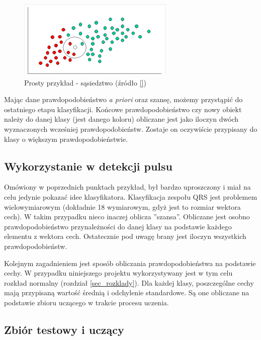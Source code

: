 \begin{figure}[!htb]
  \begin{center}
    \includegraphics[scale = 1]
    {img/bayes_przyklad_2.png}
  \end{center}
  \caption{Prosty przykład - sąsiedztwo (źródło \ref{})}
  \label{fig_bayes_przyklad2}
\end{figure}

Mając dane prawdopodobieństwo \textit{a priori} oraz szansę, możemy przystąpić do ostatniego etapu klasyfikacji. Końcowe prawdopodobieństwo czy nowy obiekt należy do danej klasy (jest danego koloru) obliczane jest jako iloczyn dwóch wyznaczonych wcześniej prawdopodobieństw. Zostaje on oczywiście przypisany do klasy o większym prawdopodobieństwie.


\subsection{Wykorzystanie w detekcji pulsu}
\label{subsec_bayes_detekcja_pulsu}

Omówiony w poprzednich punktach przykład, był bardzo uproszczony i miał na celu jedynie pokazać idee klasyfikatora. Klasyfikacja zespołu QRS jest problemem wielowymiarowym (dokładnie 18 wymiarowym, gdyż jest to rozmiar wektora cech). W takim przypadku nieco inaczej oblicza ''szansa''. Obliczane jest osobno prawdopodobieństwo przynależności do danej klasy na podstawie każdego elementu z wektora cech. Ostatecznie pod uwagę brany jest iloczyn wszystkich prawdopodobieństw.

Kolejnym zagadnieniem jest sposób obliczania prawdopodobieństwa na podstawie cechy. W przypadku niniejszego projektu wykorzystywany jest w tym celu rozkład normalny (rozdział \ref{sec_rozklady}). Dla każdej klasy, poszczególne cechy mają przypisaną wartość średnią i odchylenie standardowe. Są one obliczane na podstawie zbioru uczącego w trakcie procesu uczenia.

\subsection{Zbiór testowy i uczący}
\label{subsec_test_ucz}

